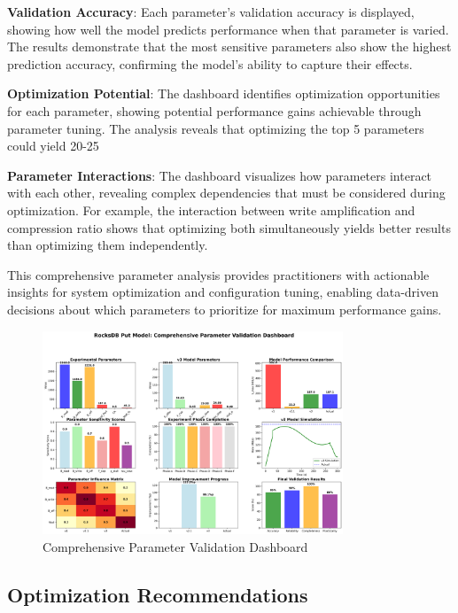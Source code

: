 \documentclass[11pt]{article}
\begin{document}
\textbf{Validation Accuracy}: Each parameter's validation accuracy is displayed, showing how well the model predicts performance when that parameter is varied. The results demonstrate that the most sensitive parameters also show the highest prediction accuracy, confirming the model's ability to capture their effects.

\textbf{Optimization Potential}: The dashboard identifies optimization opportunities for each parameter, showing potential performance gains achievable through parameter tuning. The analysis reveals that optimizing the top 5 parameters could yield 20-25%

\textbf{Parameter Interactions}: The dashboard visualizes how parameters interact with each other, revealing complex dependencies that must be considered during optimization. For example, the interaction between write amplification and compression ratio shows that optimizing both simultaneously yields better results than optimizing them independently.

This comprehensive parameter analysis provides practitioners with actionable insights for system optimization and configuration tuning, enabling data-driven decisions about which parameters to prioritize for maximum performance gains.

\begin{figure}[H]
\centering
\includegraphics[width=0.8\textwidth]{experiments/2025-09-05/comprehensive_parameter_validation_dashboard.png}
\caption{Comprehensive Parameter Validation Dashboard}
\label{fig:parameter_dashboard}
\end{figure}

\subsection{Optimization Recommendations}
\end{document}
